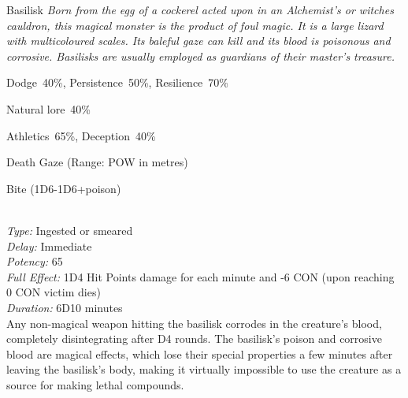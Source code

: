 \begin{monsterbox}{Basilisk}
	\textit{Born from the egg of a cockerel acted upon in an Alchemist’s or witches cauldron, this magical monster is the product of foul magic. It is a large lizard with multicoloured scales. Its baleful gaze can kill and its blood is poisonous and corrosive. Basilisks are usually employed as guardians of their master’s treasure.}\\
	\rpghline
	\basics[%
        hitpoints  = 8, %
	majorwound = 4,
	damagemodifier = -1D6,
	powerpoints = 16,
	movementrate = 15m,
	armor = Armour Scales (2AP),
	plunderrating = 5
	]
	\rpghline%
	\stats[ %
		STR = 2D3   (4),
		CON = 2D6+6 (13),
		DEX = 3D6   (11),
		SIZ = 1D3   (2),
		INT = 3     (3),
		POW = 1D6+12 (16),
		CHA = 3     (3)
	]
	\rpghline%
	\begin{rpg-monsteraction}[Resistances]
		Dodge~40\%, Persistence~50\%, Resilience~70\%
	\end{rpg-monsteraction}
	\begin{rpg-monsteraction}[Knowledge]
    		Natural lore~40\%
	\end{rpg-monsteraction}
	\begin{rpg-monsteraction}[Practical]
		Athletics~65\%, Deception~40\%
	\end{rpg-monsteraction}
	\begin{rpg-monsteraction}
		Death Gaze (Range: POW in metres)
	\end{rpg-monsteraction}
	\begin{rpg-monsteraction}
		Bite (1D6-1D6+poison)
	\end{rpg-monsteraction}
	\begin{rpg-monsteraction}\\
		\textit{Type:} Ingested or smeared\\
		\textit{Delay:} Immediate\\
		\textit{Potency:} 65\\
		\textit{Full Effect:} 1D4 Hit Points damage for each minute and -6 CON (upon reaching 0 CON victim dies)\\ 
		\textit{Duration:} 6D10 minutes\\
		Any non-magical weapon hitting the basilisk corrodes in the creature’s blood, completely disintegrating after D4 rounds. The basilisk’s poison and corrosive blood are magical effects, which lose their special properties a few minutes after leaving the basilisk’s body, making it virtually impossible to use the creature as a source for making lethal compounds.

\end{rpg-monsteraction}
\end{monsterbox}
